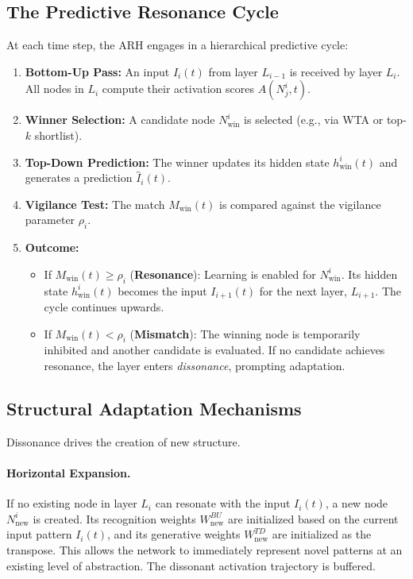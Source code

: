 \documentclass{article}
\numberwithin{figure}{section}
\numberwithin{table}{section}
\numberwithin{algorithm}{section}
\begin{document}
\subsection{The Predictive Resonance Cycle}
At each time step, the ARH engages in a hierarchical predictive cycle:
\begin{enumerate}
    \item \textbf{Bottom-Up Pass:} An input $I_i(t)$ from layer $L_{i-1}$ is received by layer $L_i$. All nodes in $L_i$ compute their activation scores $A(N_j^i, t)$.
    \item \textbf{Winner Selection:} A candidate node $N_{\text{win}}^i$ is selected (e.g., via WTA or top-$k$ shortlist).
    \item \textbf{Top-Down Prediction:} The winner updates its hidden state $h_{\text{win}}^i(t)$ and generates a prediction $\hat{I}_i(t)$.
    \item \textbf{Vigilance Test:} The match $M_{\text{win}}(t)$ is compared against the vigilance parameter $\rho_i$.
    \item \textbf{Outcome:}
    \begin{itemize}
        \item If $M_{\text{win}}(t) \ge \rho_i$ (\textbf{Resonance}): Learning is enabled for $N_{\text{win}}^i$. Its hidden state $h_{\text{win}}^i(t)$ becomes the input $I_{i+1}(t)$ for the next layer, $L_{i+1}$. The cycle continues upwards.
        \item If $M_{\text{win}}(t) < \rho_i$ (\textbf{Mismatch}): The winning node is temporarily inhibited and another candidate is evaluated. If no candidate achieves resonance, the layer enters \emph{dissonance}, prompting adaptation.
    \end{itemize}
\end{enumerate}

\subsection{Structural Adaptation Mechanisms}
Dissonance drives the creation of new structure.

\paragraph{Horizontal Expansion.} If no existing node in layer $L_i$ can resonate with the input $I_i(t)$, a new node $N_{\text{new}}^i$ is created. Its recognition weights $W_{\text{new}}^{BU}$ are initialized based on the current input pattern $I_i(t)$, and its generative weights $W_{\text{new}}^{TD}$ are initialized as the transpose. This allows the network to immediately represent novel patterns at an existing level of abstraction. The dissonant activation trajectory is buffered.
\end{document}
